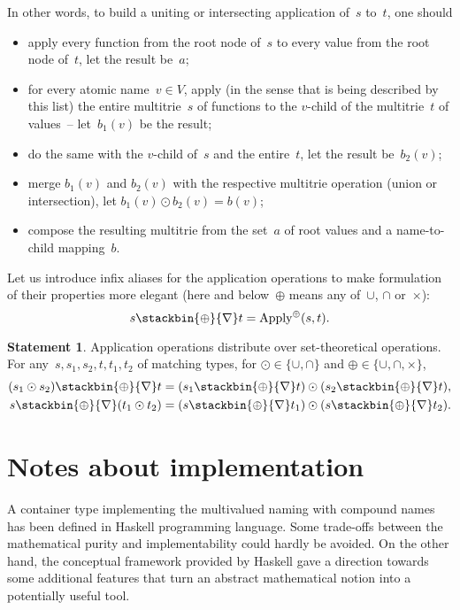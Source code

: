 \documentclass{article}
\theoremstyle{definition}
\newtheorem{St}{Statement}
\newcommand{\apply}{\operatorname{Apply}}
\newcommand{\inapply}[1]{\stackbin{#1}{\nabla}}
\begin{document}
In other words, to build a uniting or intersecting application of~$s$ to~$t$,
one should
\begin{itemize}
\item apply every function from the root node of~$s$ to every value from
the root node of~$t$, let the result be~$a$;
\item for every atomic name~$v\in V$, apply (in the sense that is being
described by this list) the entire multitrie~$s$ of
functions to the $v$-child of the multitrie~$t$ of values~-- let~$b_1(v)$ be
the result;
\item do the same with the $v$-child of~$s$ and the entire~$t$, let the result
be~$b_2(v)$;
\item merge $b_1(v)$ and $b_2(v)$ with the respective multitrie operation
(union or intersection), let $b_1(v)\odot b_2(v) = b(v)$;
\item compose the resulting multitrie from the set~$a$ of root values and a
name-to-child mapping~$b$.
\end{itemize}

Let us introduce infix aliases for the application operations to make
formulation of their properties more elegant (here and below~$\oplus$ means any
of~$\cup$, $\cap$ or~$\times$):
\[
  s \inapply{\oplus} t = \apply^{\oplus} (s, t) .
\]

\begin{St}\label{st:apply-distr}
Application operations distribute over set-theoretical operations.
For any~$s, s_1, s_2, t, t_1, t_2$ of matching types,
for $\odot \in \{\cup, \cap \}$ and $\oplus \in \{\cup, \cap, \times \}$,
\begin{eqnarray*}
  (s_1 \odot s_2) \inapply{\oplus} t =
    (s_1 \inapply{\oplus} t) \odot (s_2 \inapply{\oplus} t) , \\
  s \inapply{\oplus} (t_1 \odot t_2) =
    (s \inapply{\oplus} t_1) \odot (s \inapply{\oplus} t_2) .
\end{eqnarray*}
\end{St}

\section{Notes about implementation}

A container type implementing the multivalued naming with compound names has
been defined in Haskell programming language. Some trade-offs between the
mathematical purity and implementability could hardly be avoided. On the other
hand, the conceptual framework provided by Haskell gave a
direction towards some additional features that turn an abstract mathematical
notion into a potentially useful tool.
\end{document}
